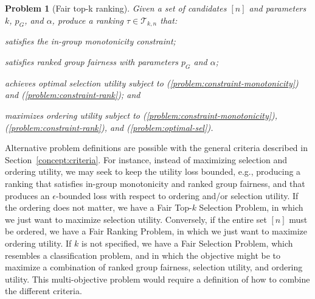 \newtheorem*{problem*}{Problem}
\begin{problem*}[Fair top-k ranking]
	Given a set of candidates $[n]$ and parameters $k$, $p_G$, and $\alpha$, produce a ranking $\tau \in {\mathcal T}_{k,n}$ that:
	\begin{compactenum}[(i)]
		\item \label{problem:constraint-monotonicity} satisfies the in-group monotonicity constraint;
		\item \label{problem:constraint-rank} satisfies ranked group fairness with parameters $p_G$ and $\alpha$;
		\item \label{problem:optimal-sel} achieves optimal selection utility subject to (\ref{problem:constraint-monotonicity}) and (\ref{problem:constraint-rank}); and
		\item \label{problem:maximum-ord} maximizes ordering utility subject to (\ref{problem:constraint-monotonicity}), (\ref{problem:constraint-rank}), and (\ref{problem:optimal-sel}).
	\end{compactenum}
\end{problem*}

\label{concept:related-problems}
%
Alternative problem definitions are possible with the general criteria described in Section~\ref{concept:criteria}.
%
For instance, instead of maximizing selection and ordering utility, we may seek to keep the utility loss bounded, e.g., producing a ranking that satisfies in-group monotonicity and ranked group fairness, and that produces an $\epsilon$-bounded loss with respect to ordering and/or selection utility.
%
If the ordering does not matter, we have a {\sc Fair Top-$k$ Selection Problem}, in which we just want to maximize selection utility.
%
Conversely, if the entire set $[n]$ must be ordered, we have a {\sc Fair Ranking Problem}, in which we just want to maximize ordering utility.
%
If $k$ is not specified, we have a {\sc Fair Selection Problem}, which resembles a classification problem, and in which the objective might be to  maximize a combination of ranked group fairness, selection utility, and ordering utility.
%
This multi-objective problem would require a definition of how to combine the different criteria.
%
